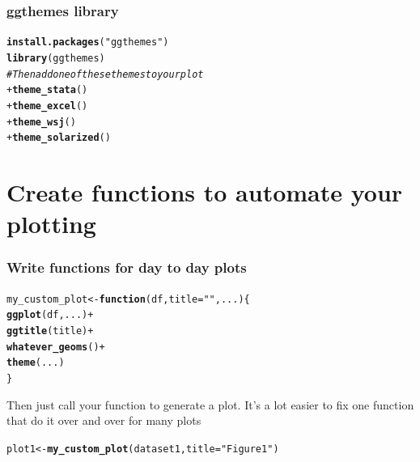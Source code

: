 \documentclass{beamer}\usepackage[]{graphicx}\usepackage[]{color}
\makeatletter
\newcommand{\hlstr}[1]{\textcolor[rgb]{0.192,0.494,0.8}{#1}}%
\newcommand{\hlcom}[1]{\textcolor[rgb]{0.678,0.584,0.686}{\textit{#1}}}%
\newcommand{\hlkwd}[1]{\textcolor[rgb]{0.737,0.353,0.396}{\textbf{#1}}}%
\newenvironment{kframe}{%
 \def\at@end@of@kframe{}%
 \ifinner\ifhmode%
  \def\at@end@of@kframe{\end{minipage}}%
  \begin{minipage}{\columnwidth}%
 \fi\fi%
 \def\FrameCommand##1{\hskip\@totalleftmargin \hskip-\fboxsep
 \colorbox{shadecolor}{##1}\hskip-\fboxsep
     \hskip-\linewidth \hskip-\@totalleftmargin \hskip\columnwidth}%
 \MakeFramed {\advance\hsize-\width
   \@totalleftmargin\z@ \linewidth\hsize
   \@setminipage}}%
 {\par\unskip\endMakeFramed%
 \at@end@of@kframe}
\newenvironment{knitrout}{}{} %
\makeatother
\begin{document}

\begin{frame}[fragile]
\frametitle{ggthemes library}
\begin{knitrout}\footnotesize
{}\color{fgcolor}\begin{kframe}
\begin{alltt}
\hlkwd{install.packages}(\hlstr{"ggthemes"})
\hlkwd{library}(ggthemes)
\hlcom{# Then add one of these themes to your plot}
+\hlkwd{theme_stata}()
+\hlkwd{theme_excel}()
+\hlkwd{theme_wsj}()
+\hlkwd{theme_solarized}()
\end{alltt}
\end{kframe}
\end{knitrout}

\end{frame}


\section*{Create functions to automate your plotting}
\frame{\sectionpage}


\begin{frame}[fragile]
\frametitle{Write functions for day to day plots}
\begin{knitrout}\footnotesize
{}\color{fgcolor}\begin{kframe}
\begin{alltt}
my_custom_plot <- \hlkwd{function}(df, title = \hlstr{""}, ...) \{
    \hlkwd{ggplot}(df, ...) +
    \hlkwd{ggtitle}(title) +
    \hlkwd{whatever_geoms}() +
    \hlkwd{theme}(...)
\}
\end{alltt}
\end{kframe}
\end{knitrout}


Then just call your function to generate a plot.
It's a lot easier to fix one function that do it over and over for many plots
\begin{knitrout}\footnotesize
{}\color{fgcolor}\begin{kframe}
\begin{alltt}
plot1 <- \hlkwd{my_custom_plot}(dataset1, title = \hlstr{"Figure 1"})
\end{alltt}
\end{kframe}
\end{knitrout}


\end{frame}
\end{document}

